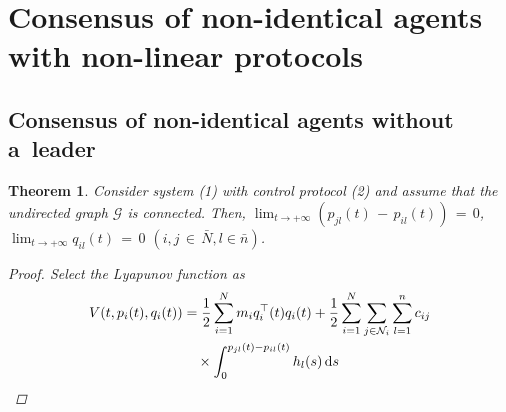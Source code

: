 \documentclass{cta-author}
\newtheorem{theorem}{Theorem}{}
\begin{document}
\section{Consensus of non-identical agents with non-linear protocols}\label{sec3}

\subsection{Consensus of non-identical agents without a~leader}\label{sec3.1}

\begin{theorem}\label{thm1}
Consider system (1) with control
protocol (2) and assume that the undirected graph $\mathcal{G}$ is
connected. Then, $\lim_{t \rightarrow +\infty}
(p_{jl}(t)\,{-}\,p_{il}(t))\,{=}\,0$, $\lim_{t \rightarrow +\infty}
q_{il}(t)\,{=}\,0$ $(i, j\,{\in}\,\bar{N}, l\in\bar{n})$.

\begin{proof}
Select the Lyapunov function as
\begin{align}\label{eq5}
V(t,p_{i}(t),q_{i}(t))&=\frac{1}{2}\sum_{i=1}^{N}m_{i}q_{i}^{\top}(t)q_{i}(t)+\frac{1}{2}\sum_{i=1}^{N}\sum_{j \in \mathcal{N}_{i}}\sum_{l=1}^{n}c_{ij}\notag\\
&\quad \times\int^{p_{jl}(t)-p_{il}(t)}_{0}h_{l}(s)\,{\rm d}s
\end{align}


\end{proof}
\end{theorem}
\end{document}
